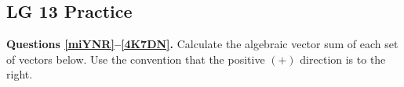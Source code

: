 \documentclass[]{exam}
\begin{document}
\begin{questions}
\question 
\phantom{.}
\vspace{-1em}

\begin{center}
\end{center}

\question \label{unser}
\phantom{.}
\vspace{-1em}

\begin{center}
\end{center}

\end{questions}



\clearpage

\subsection*{LG 13 Practice}

\textbf{Questions \ref{miYNR}--\ref{4K7DN}.} Calculate the algebraic vector sum of each set of vectors below. Use the convention that the positive $\left(+\right)$ direction is to the right.
\end{document}
